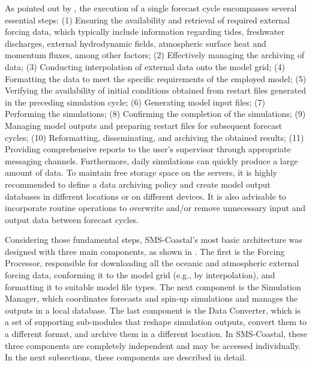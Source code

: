 As pointed out by \textcite{almeida2011oof}, the execution of a single forecast cycle encompasses several essential steps: (1) Ensuring the availability and retrieval of required external forcing data, which typically include information regarding tides, freshwater discharges, external hydrodynamic fields, atmospheric surface heat and momentum fluxes, among other factors; (2) Effectively managing the archiving of data; (3) Conducting interpolation of external data onto the model grid; (4) Formatting the data to meet the specific requirements of the employed model; (5) Verifying the availability of initial conditions obtained from restart files generated in the preceding simulation cycle; (6) Generating model input files; (7) Performing the simulations; (8) Confirming the completion of the simulations; (9) Managing model outputs and preparing restart files for subsequent forecast cycles; (10) Reformatting, disseminating, and archiving the obtained results; (11) Providing comprehensive reports to the user's supervisor through appropriate messaging channels. Furthermore, daily simulations can quickly produce a large amount of data. To maintain free storage space on the servers, it is highly recommended to define a data archiving policy and create model output databases in different locations or on different devices. It is also advisable to incorporate routine operations to overwrite and/or remove unnecessary input and output data between forecast cycles.

Considering those fundamental steps, SMS-Coastal's most basic architecture was designed with three main components, as shown in . The first is the Forcing Processor, responsible for downloading all the oceanic and atmospheric external forcing data, conforming it to the model grid (e.g., by interpolation), and formatting it to suitable model file types. The next component is the Simulation Manager, which coordinates forecasts and spin-up simulations and manages the outputs in a local database. The last component is the Data Converter, which is a set of supporting sub-modules that reshape simulation outputs, convert them to a different format, and archive them in a different location. In SMS-Coastal, these three components are completely independent and may be accessed individually. In the next subsections, these components are described in detail.


